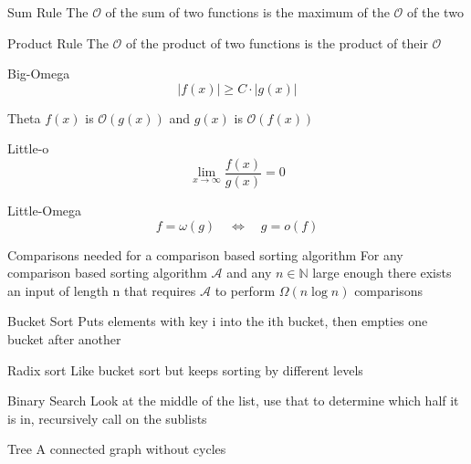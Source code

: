 \documentclass[grid,avery5371]{flashcards}
\begin{document}
\begin{flashcard}[]{Sum Rule}
The $\mathcal{O}$ of the sum of two functions is the maximum of the $\mathcal{O}$ of the two
\end{flashcard}

\begin{flashcard}[]{Product Rule}
	The $\mathcal{O}$ of the product of two functions is the product of their $\mathcal{O}$
\end{flashcard}

\begin{flashcard}[]{Big-Omega}
	$$|f(x)|\geqslant C\cdot |g(x)|$$
\end{flashcard}

\begin{flashcard}[]{Theta}
	$f(x)$ is $\mathcal{O}(g(x))$ and $g(x)$ is $\mathcal{O}(f(x))$
\end{flashcard}

\begin{flashcard}[]{Little-o}
	\[
	\lim _{x \rightarrow \infty} \frac{f(x)}{g(x)}=0
	\]
\end{flashcard}

\begin{flashcard}[]{Little-Omega}
	\[
	f=\omega(g) \quad \Leftrightarrow \quad g=o(f)
	\]
\end{flashcard}

\begin{flashcard}[]{Comparisons needed for a comparison based sorting algorithm}
	For any comparison based sorting algorithm $\mathcal{A}$ and any $n\in \mathbb{N}$ large enough there exists an input of length n that requires $\mathcal{A}$ to perform $\Omega(n\log n)$ comparisons
\end{flashcard}

\begin{flashcard}[]{Bucket Sort}
Puts elements with key i into the ith bucket, then empties one bucket after another
\end{flashcard}

\begin{flashcard}[]{Radix sort}
	Like bucket sort but keeps sorting by different levels
\end{flashcard}

\begin{flashcard}[]{Binary Search}
	Look at the middle of the list, use that to determine which half it is in, recursively call on the sublists
\end{flashcard}

\begin{flashcard}[]{Tree}
	A connected graph without cycles
\end{flashcard}
\end{document}
